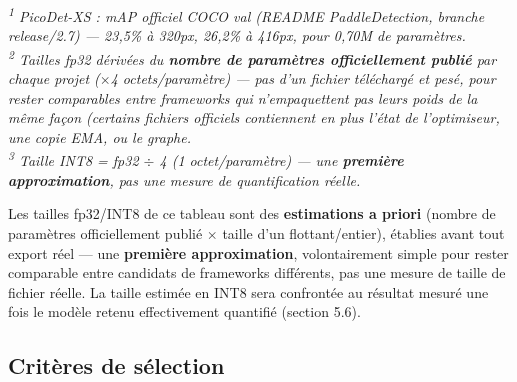 \documentclass[11pt,a4paper]{article}
\let\Oldsubsection\subsection
\renewcommand{\subsection}{\FloatBarrier\Oldsubsection}
\begin{document}
\begin{table}[!htbp]
    \vspace{0.6em}
    \raggedright
    \textit{\footnotesize\textsuperscript{1} PicoDet-XS : mAP officiel COCO
    val (README PaddleDetection, branche release/2.7) --- 23,5\% à 320px,
    26,2\% à 416px, pour 0,70M de paramètres.\\
    \textsuperscript{2} Tailles fp32 dérivées du \textbf{nombre de
    paramètres officiellement publié} par chaque projet ($\times$4 octets/paramètre) --- pas d'un fichier téléchargé et pesé, pour rester comparables entre frameworks qui n'empaquettent pas leurs poids de la même façon (certains fichiers officiels contiennent en plus l'état de l'optimiseur, une copie EMA, ou le graphe.\\
    \textsuperscript{3} Taille INT8 = fp32 $\div$ 4 (1 octet/paramètre) ---
    une \textbf{première approximation}, pas une mesure de quantification
    réelle.}
    \end{table}
    
    Les tailles fp32/INT8 de ce tableau sont des \textbf{estimations a
    priori} (nombre de paramètres officiellement publié $\times$ taille
    d'un flottant/entier), établies avant tout export réel --- une
    \textbf{première approximation}, volontairement simple pour rester
    comparable entre candidats de frameworks différents, pas une mesure de taille de fichier réelle. La taille estimée en INT8 sera confrontée au résultat
    mesuré une fois le modèle retenu effectivement quantifié (section 5.6).
    
    \subsection{Critères de sélection}
    
\end{document}
